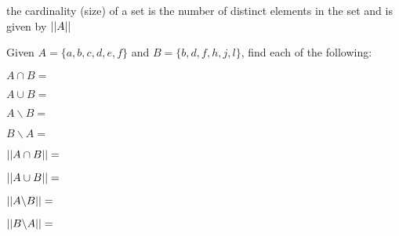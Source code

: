 \vspace{.2in}
\begin{definition}
the cardinality (size) of a set is the number of distinct elements in the set and is given by $\abs{\abs{A}}$
\end{definition}
\vspace{.2in}
\begin{example}
Given $A = \{a,b,c,d,e,f\}$ and $B = \{b,d,f,h,j,l\}$, find each of the following:
\begin{enumerate}
\begin{minipage}{.5\textwidth}

\item $A \cap B = $
\vspace{.25in}
\item $A \cup B = $
\vspace{.25in}
\item $A\backslash B = $
\vspace{.25in}
\item $B\backslash A = $
\vspace{.25in}
\end{minipage}%
\begin{minipage}{.5\textwidth}
\item $\abs{\abs{A \cap B}} = $
\vspace{.25in}
\item $\abs{\abs{A \cup B }}= $
\vspace{.25in}
\item $\abs{\abs{A\backslash B}} = $
\vspace{.25in}
\item $\abs{\abs{B\backslash A}} = $
\vspace{.25in}

\end{minipage}%
\end{enumerate}
\end{example}


